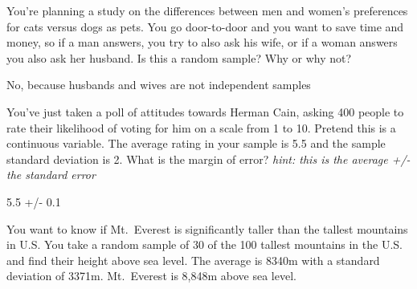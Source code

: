 \documentclass[11pt]{exam}
\begin{document}
\begin{questions}



\question[3] You're planning a study on the differences between men and
women's preferences for cats versus dogs as pets.  You go door-to-door and
you want to save time and money, so if a man answers, you try to also ask
his wife, or if a woman answers you also ask her husband.  Is this a random sample?
Why or why not?
\begin{solutionordottedlines}[0.5in]
No, because husbands and wives are not independent samples
\end{solutionordottedlines}



\question[3] You've just taken a poll of attitudes towards Herman Cain,
asking 400 people to rate their likelihood of voting for him on a scale
from 1 to 10.  Pretend this is a continuous variable.  The average rating
in your sample is
5.5 and the sample standard deviation is 
2.  What is the margin of error? \emph{hint: this is the average +/- the
  standard error}
\begin{solutionordottedlines}[0.3in]
5.5  +/-  0.1\end{solutionordottedlines}




  \question You want to know if Mt.~Everest is significantly taller than
  the tallest mountains in U.S.  You take a random sample of 30 of the 100
  tallest mountains in the U.S. and find their height above sea level.  The
  average is
8340m with a standard deviation of
3371m. Mt.~Everest is 8,848m above sea level.


\end{questions}
\end{document}
